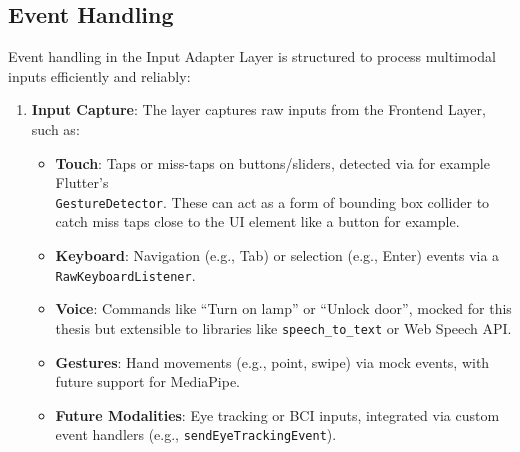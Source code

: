 \documentclass[openany]{book}
\begin{document}
    \subsection{Event Handling}
    Event handling in the Input Adapter Layer is structured to process multimodal inputs efficiently and reliably:
    \begin{enumerate}
        \item \textbf{Input Capture}: The layer captures raw inputs from the Frontend Layer, such as:
        \begin{itemize}
            \item \textbf{Touch}: Taps or miss-taps on buttons/sliders, detected via for example Flutter’s \\
            \verb|GestureDetector|. These can act as a form of bounding box collider to catch miss taps close to the UI element like a button for example.
            \item \textbf{Keyboard}: Navigation (e.g., Tab) or selection (e.g., Enter) events via a \\
            \verb|RawKeyboardListener|.
            \item \textbf{Voice}: Commands like “Turn on lamp” or “Unlock door”, mocked for this thesis but extensible to libraries like \verb|speech_to_text| or Web Speech API.
            \item \textbf{Gestures}: Hand movements (e.g., point, swipe) via mock events, with future support for MediaPipe.
            \item \textbf{Future Modalities}: Eye tracking or BCI inputs, integrated via custom event handlers (e.g., \verb|sendEyeTrackingEvent|).
        \end{itemize}


\end{enumerate}
\end{document}
